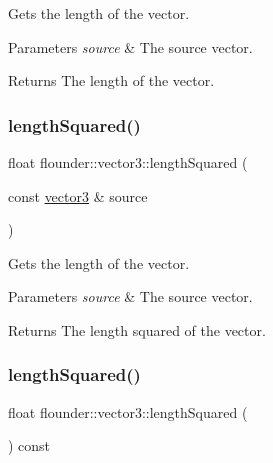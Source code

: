 Gets the length of the vector. 


\begin{DoxyParams}{Parameters}
{\em source} & The source vector. \\
\hline
\end{DoxyParams}
\begin{DoxyReturn}{Returns}
The length of the vector. 
\end{DoxyReturn}
\mbox{\label{classflounder_1_1vector3_aedbc786b7cfa2c647f6f0afb391b722a}} 
\subsubsection{\texorpdfstring{length\+Squared()}{lengthSquared()}\hspace{0.1cm}{\footnotesize\ttfamily [1/2]}}
{\footnotesize\ttfamily float flounder\+::vector3\+::length\+Squared (\begin{DoxyParamCaption}\item[{const \hyperlink{classflounder_1_1vector3}{vector3} \&}]{source }\end{DoxyParamCaption})\hspace{0.3cm}{\ttfamily [static]}}



Gets the length of the vector. 


\begin{DoxyParams}{Parameters}
{\em source} & The source vector. \\
\hline
\end{DoxyParams}
\begin{DoxyReturn}{Returns}
The length squared of the vector. 
\end{DoxyReturn}
\mbox{\label{classflounder_1_1vector3_a09de6c48569a03b23f5857ef771461e7}} 
\subsubsection{\texorpdfstring{length\+Squared()}{lengthSquared()}\hspace{0.1cm}{\footnotesize\ttfamily [2/2]}}
{\footnotesize\ttfamily float flounder\+::vector3\+::length\+Squared (\begin{DoxyParamCaption}{ }\end{DoxyParamCaption}) const}



